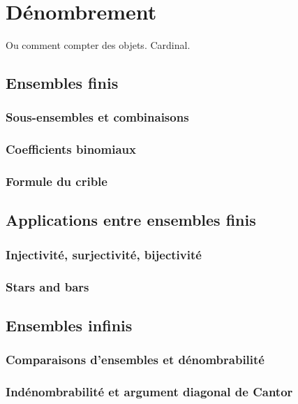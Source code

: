 
\chapter{Dénombrement}
\label{chap:2}

Ou comment compter des objets.
Cardinal.

\section{Ensembles finis}

\subsection{Sous-ensembles et combinaisons}

\subsection{Coefficients binomiaux}

\subsection{Formule du crible}

\section{Applications entre ensembles finis}

\subsection{Injectivité, surjectivité, bijectivité}

\subsection{Stars and bars}

\section{Ensembles infinis}

\subsection{Comparaisons d'ensembles et dénombrabilité}

\subsection{Indénombrabilité et argument diagonal de Cantor}


